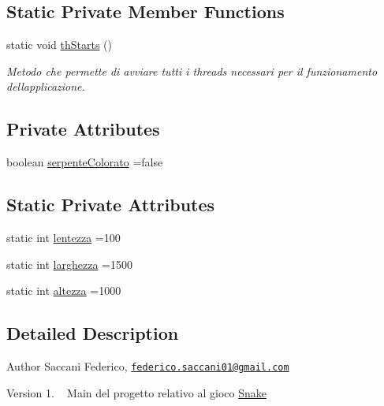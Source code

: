 \subsection*{Static Private Member Functions}
\begin{DoxyCompactItemize}
\item 
static void \mbox{\hyperlink{classmain_a28055606ff9f6030517770a96e4864e8}{th\+Starts}} ()
\begin{DoxyCompactList}\small\item\em Metodo che permette di avviare tutti i threads necessari per il funzionamento dell\textquotesingle{}applicazione. \end{DoxyCompactList}\end{DoxyCompactItemize}
\subsection*{Private Attributes}
\begin{DoxyCompactItemize}
\item 
boolean \mbox{\hyperlink{classmain_a23cfb877f1f20af97a29e6f61424aa80}{serpente\+Colorato}} =false
\end{DoxyCompactItemize}
\subsection*{Static Private Attributes}
\begin{DoxyCompactItemize}
\item 
static int \mbox{\hyperlink{classmain_a4f5efe2a0b2711ad1b63143c5ce94bcd}{lentezza}} =100
\item 
static int \mbox{\hyperlink{classmain_ad41dcd7160c56278e318dd1e98c2427c}{larghezza}} =1500
\item 
static int \mbox{\hyperlink{classmain_a7f1f35801399ed3e36906a1e6f99eb49}{altezza}} =1000
\end{DoxyCompactItemize}


\subsection{Detailed Description}
\begin{DoxyAuthor}{Author}
Saccani Federico, \href{mailto:federico.saccani01@gmail.com}{\tt federico.\+saccani01@gmail.\+com} 
\end{DoxyAuthor}
\begin{DoxyVersion}{Version}
1. ~\newline
Main del progetto relativo al gioco \mbox{\hyperlink{namespace_snake}{Snake}} 
\end{DoxyVersion}


